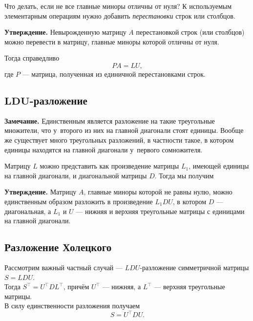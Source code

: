 \documentclass[11pt,a4paper]{article}
\begin{document}
Что делать, если не все главные миноры отличны от нуля? К используемым
элементарным операциям нужно добавить \emph{перестановки} строк или
столбцов.

\textbf{Утверждение.} Невырожденную матрицу \(A\) перестановкой строк
(или столбцов) можно перевести в матрицу, главные миноры которой отличны
от нуля.

Тогда справедливо \[ PA = LU,\] где \(P\) --- матрица, полученная из
единичной перестановками строк.

    \hypertarget{mathbfldu-ux440ux430ux437ux43bux43eux436ux435ux43dux438ux435}{%
\subsection{\texorpdfstring{\(\mathbf{LDU}\)-разложение}{LDU-разложение}}\label{mathbfldu-ux440ux430ux437ux43bux43eux436ux435ux43dux438ux435}}

\textbf{Замечание.} Единственным является разложение на такие
треугольные множители, что у~второго из них на главной диагонали стоят
единицы. Вообще же существует много треугольных разложений, в частности
такое, в котором единицы находятся на главной диагонали у~первого
сомножителя.

Матрицу \(L\) можно представить как произведение матрицы \(L_1\),
имеющей единицы на главной диагонали, и диагональной матрицы \(D\).
Тогда мы получим

\textbf{Утверждение.} Матрицу \(A\), главные миноры которой не равны
нулю, можно единственным образом разложить в произведение \(L_1 D U\), в
котором \(D\) --- диагональная, а \(L_1\) и \(U\) --- нижняя и верхняя
треугольные матрицы с единицами на главной диагонали.

    \hypertarget{ux440ux430ux437ux43bux43eux436ux435ux43dux438ux435-ux445ux43eux43bux435ux446ux43aux43eux433ux43e}{%
\subsection{Разложение
Холецкого}\label{ux440ux430ux437ux43bux43eux436ux435ux43dux438ux435-ux445ux43eux43bux435ux446ux43aux43eux433ux43e}}

Рассмотрим важный частный случай --- \(LDU\)-разложение симметричной
матрицы \(S = LDU\).\\
Тогда \(S^\top = U^\top D L^\top\), причём \(U^\top\) --- нижняя, а
\(L^\top\) --- верхняя треугольные матрицы.\\
В силу единственности разложения получаем \[ S = U^\top D U. \]
\end{document}
